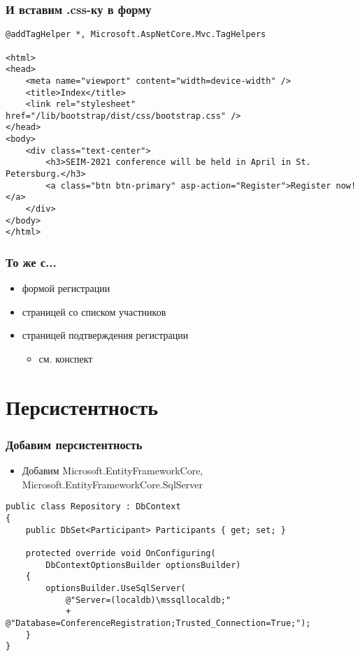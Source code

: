 \documentclass[xetex,mathserif,serif]{beamer}
\begin{document}
    \begin{frame}[fragile]
        \frametitle{И вставим .css-ку в форму}
        \begin{small}
            \begin{verbatim}
@addTagHelper *, Microsoft.AspNetCore.Mvc.TagHelpers

<html>
<head>
    <meta name="viewport" content="width=device-width" />
    <title>Index</title>
    <link rel="stylesheet" href="/lib/bootstrap/dist/css/bootstrap.css" />
</head>
<body>
    <div class="text-center">
        <h3>SEIM-2021 conference will be held in April in St. Petersburg.</h3>
        <a class="btn btn-primary" asp-action="Register">Register now!</a>
    </div>
</body>
</html>
            \end{verbatim}
        \end{small}
    \end{frame}

    \begin{frame}
        \frametitle{То же с...}
        \begin{itemize}
            \item формой регистрации
            \item страницей со списком участников
            \item страницей подтверждения регистрации
            \begin{itemize}
                \item см. конспект
            \end{itemize}
        \end{itemize}
    \end{frame}

    \section{Персистентность}

    \begin{frame}[fragile]
        \frametitle{Добавим персистентность}
        \begin{itemize}
            \item Добавим Microsoft.EntityFrameworkCore, Microsoft.EntityFrameworkCore.SqlServer
        \end{itemize}
        \begin{small}
            \begin{verbatim}
public class Repository : DbContext
{
    public DbSet<Participant> Participants { get; set; }

    protected override void OnConfiguring(
        DbContextOptionsBuilder optionsBuilder)
    {
        optionsBuilder.UseSqlServer(
            @"Server=(localdb)\mssqllocaldb;"
            + @"Database=ConferenceRegistration;Trusted_Connection=True;");
    }
}
            \end{verbatim}
        \end{small}
    \end{frame}
\end{document}
